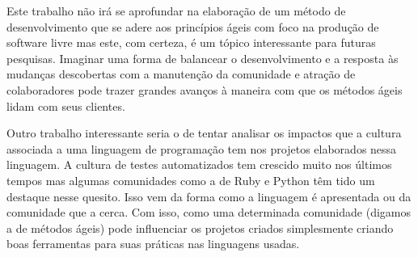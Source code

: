 Este trabalho não irá se aprofundar na elaboração de um método de
desenvolvimento que se adere aos princípios ágeis com foco na produção
de software livre mas este, com certeza, é um tópico interessante para
futuras pesquisas. Imaginar uma forma de balancear o desenvolvimento e
a resposta às mudanças descobertas com a manutenção da comunidade e
atração de colaboradores pode trazer grandes avanços à maneira com que
os métodos ágeis lidam com seus clientes.

Outro trabalho interessante seria o de tentar analisar os impactos que
a cultura associada a uma linguagem de programação tem nos projetos
elaborados nessa linguagem. A cultura de testes automatizados tem
crescido muito nos últimos tempos mas algumas comunidades como a de
Ruby e Python têm tido um destaque nesse quesito. Isso vem da forma
como a linguagem é apresentada ou da comunidade que a cerca. Com isso,
como uma determinada comunidade (digamos a de métodos ágeis) pode
influenciar os projetos criados simplesmente criando boas ferramentas
para suas práticas nas linguagens usadas.
